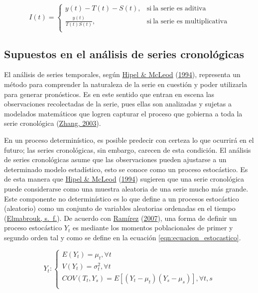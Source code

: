 \documentclass[
]{article}
\begin{document}
\begin{equation}
\label{eqn:descomposicion_irregular}
I(t)=
\begin{cases}
y(t)-T(t)-S(t), & \text{si}\ \text{la serie es aditiva} \\
\frac{y(t)}{T(t)S(t)} , & \text{si}\ \text{la serie es multiplicativa} \\
\end{cases}
\end{equation}

\subsection{Supuestos en el análisis de series cronológicas}

El análisis de series temporales, según
\protect\hyperlink{ref-Hipel}{Hipel \& McLeod}
(\protect\hyperlink{ref-Hipel}{1994}), representa un método para
comprender la naturaleza de la serie en cuestión y poder utilizarla para
generar pronósticos. Es en este sentido que entran en escena las
observaciones recolectadas de la serie, pues ellas son analizadas y
sujetas a modelados matemáticos que logren capturar el proceso que
gobierna a toda la serie cronológica
(\protect\hyperlink{ref-Zhang}{Zhang, 2003}).

En un proceso determinístico, es posible predecir con certeza lo que
ocurrirá en el futuro; las series cronológicas, sin embargo, carecen de
esta condición. El análisis de series cronológicas asume que las
observaciones pueden ajustarse a un determinado modelo estadístico, esto
se conoce como un proceso estocástico. Es de esta manera que
\protect\hyperlink{ref-Hipel}{Hipel \& McLeod}
(\protect\hyperlink{ref-Hipel}{1994}) sugieren que una serie cronológica
puede considerarse como una muestra aleatoria de una serie mucho más
grande. Este componente no determinístico es lo que define a un procesos
estocástico (aleatorio) como un conjunto de variables aleatorias
ordenadas en el tiempo
(\protect\hyperlink{ref-definicion_estocastico}{Elmabrouk, s.~f.}). De
acuerdo con \protect\hyperlink{ref-introduccion_series}{Ramírez}
(\protect\hyperlink{ref-introduccion_series}{2007}), una forma de
definir un proceso estocástico \(Y_t\) es mediante los momentos
poblacionales de primer y segundo orden tal y como se define en la
ecuación \ref{eqn:ecuacion_estocastico}.

\begin{equation}
\label{eqn:ecuacion_estocastico}
Y_t:
\begin{cases}
E(Y_t) = \mu_t, \forall t \\
V(Y_t) = \sigma^2_t, \forall t \\
COV(T_t,Y_s) = E\left[(Y_t-\mu_t)(Y_s-\mu_s)\right], \forall t,s \\
\end{cases}
\end{equation}
\end{document}
